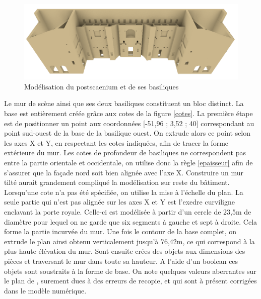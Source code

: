 \begin{figure}[!h]
	\includegraphics[width=\linewidth]{images/modMur2}
	\caption{Modélisation du \gls{postscaenium} et de ses \glspl{basilique}} 
	\label{modCavea} 
\end{figure} 

Le mur de scène ainsi que ses deux basiliques constituent un bloc distinct. La base est entièrement créée grâce aux cotes de la figure \ref{cotes}. La première étape est de positionner un point aux coordonnées [-51,96 ; 3,52 ; 40] correspondant au point sud-ouest de la base de la basilique ouest. On extrude alors ce point selon les axes X et Y, en respectant les cotes indiquées, afin de tracer la forme extérieure du mur. Les cotes de profondeur de basiliques ne correspondent pas entre la partie orientale et occidentale, on utilise donc la règle \ref{epaisseur} afin de s'assurer que la façade nord soit bien alignée avec l'axe X. Construire un mur tilté aurait grandement compliqué la modélisation sur reste du bâtiment. Lorsqu'une cote n'a pas été spécifiée, on utilise la mise à l'échelle du plan. La seule partie qui n'est pas alignée sur les axes X et Y est l'\gls{exedre} curviligne enclavant la porte royale. Celle-ci est modélisée à partir d'un cercle de 23,5m de diamètre pour lequel on ne garde que six segments à gauche et sept à droite. Cela forme la partie incurvée du mur. Une fois le contour de la base complet, on extrude le plan ainsi obtenu verticalement jusqu'à 76,42m, ce qui correspond à la plus haute élévation du mur.
Sont ensuite crées des objets aux dimensions des pièces et traversant le mur dans toute sa hauteur. A l'aide d'un \gls{boolean} ces objets sont soustraits à la forme de base. On note quelques valeurs aberrantes sur le plan de \cite[Pl. XXI]{orangePl}, surement dues à des erreurs de recopie, et qui sont à présent corrigées dans le modèle numérique. 

